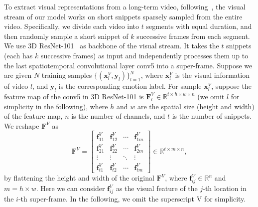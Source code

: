 \documentclass[letterpaper]{article} \usepackage{aaai20}  \usepackage{times}  \usepackage{helvet} \usepackage{courier}  \usepackage[hyphens]{url}  \usepackage{graphicx} \urlstyle{rm} \def\UrlFont{\rm}  \usepackage{graphicx}
\begin{document}
To extract visual representations from a long-term video, following~\cite{wang2016temporal}, the visual stream of our model works on short snippets sparsely sampled from the entire video. Specifically, we divide each video into $t$ segments with equal duration, and then randomly sample a short snippet of $k$ successive frames from each segment. We use 3D ResNet-101~\cite{hara2018can} as backbone of the visual stream. It takes the $t$ snippets (each has $k$ successive frames) as input and independently processes them up to the last spatiotemporal convolutional layer conv5 into a super-frame. Suppose we are given $N$ training samples $\{(\textbf{x}_l^{V},\textbf{y}_l)\}_{l=1}^{N}$, where $\textbf{x}_l^{V}$ is the visual information of video $l$, and $\textbf{y}_l$ is the corresponding emotion label.
For sample $\textbf{x}_l^{V}$, suppose the feature map of the conv5 in 3D ResNet-101 is $\textbf{F}_l^{V}\in \mathbb{R}^{t\times h\times w\times n}$ (we omit $l$ for simplicity in the following),  where $h$ and $w$ are the spatial size (height and width) of the feature map, $n$ is the number of channels, and $t$ is the number of snippets. We reshape $\textbf{F}^{V}$ as
\begin{equation}{\textbf{F}^V} = \left[ {\begin{array}{*{20}{c}}
{\textbf{f}_{11}^V}&{\textbf{f}_{12}^V}& \cdots &{\textbf{f}_{1m}^V}\\
{\textbf{f}_{21}^V}&{\textbf{f}_{22}^V}& \cdots &{\textbf{f}_{2m}^V}\\
 \vdots & \vdots & \ddots & \vdots \\
{\textbf{f}_{t1}^V}&{\textbf{f}_{t2}^V}& \cdots &{\textbf{f}_{tm}^V}
\end{array}} \right] \in {\mathbb{R}^{t \times m \times n}},
\end{equation}
by flattening the height and width of the original $\textbf{F}^{V}$, where $\textbf{f}_{ij}^{V}\in\mathbb{R}^{n}$ and $m=h\times w$. Here we can consider $\textbf{f}_{ij}^{V}$ as the visual feature of the $j$-th location in the $i$-th super-frame. In the following, we omit the superscript V for simplicity.
\end{document}
